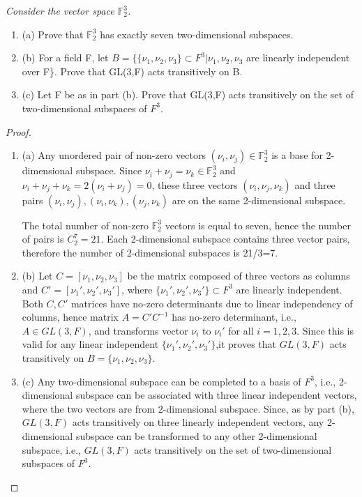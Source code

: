 \documentclass[11pt,a4paper]{article}
\newcommand{\be} {\begin{enumerate}}
\newcommand{\ee} {\end{enumerate}}
\begin{document}
{\it Consider the vector space  $\mathbb{F}_2^3$.
\be
\item[(a)] Prove that $\mathbb{F}_2^3$ has exactly seven two-dimensional subspaces.
\item[(b)] For a field F, let $B=\{\{ \nu_1,\nu_2,\nu_3\} \subset F^3| \nu_1,\nu_2,\nu_3$ are linearly independent over F\}. Prove that GL(3,F) acts transitively on B.

\item[(c)] Let F be as in part (b). Prove that GL(3,F) acts transitively on the set of two-dimensional subspaces of $F^3$.
\ee
\begin{proof}\be
\item[(a)] Any unordered pair of non-zero vectors $(\nu_i,\nu_j) \in \mathbb{F}_2^3$ is a base for 2-dimensional subspace. Since  $\nu_i+\nu_j=\nu_k \in \mathbb{F}_2^3$ and $\nu_i+\nu_j+\nu_k=2(\nu_i+\nu_j)=0$, these three vectors $(\nu_i,\nu_j,\nu_k)$ and three pairs $(\nu_i,\nu_j),(\nu_i,\nu_k),(\nu_j,\nu_k)$ are on the same 2-dimensional subspace.

The total number of non-zero $\mathbb{F}_2^3$ vectors is equal to seven, hence the number of pairs is $C_2^7=21$. Each 2-dimensional subspace contains three vector pairs, therefore the number of 2-dimensional subspaces is 21/3=7.

\item[(b)] Let $C=[\nu_1,\nu_2,\nu_3]$ be the matrix composed of three vectors as columns and $C'=[\nu_1',\nu_2',\nu_3']$, where $\{ \nu_1',\nu_2',\nu_3'\} \subset F^3$ are linearly independent. Both $C,C'$ matrices  have no-zero determinants due to linear independency of columns, hence matrix $A=C' C^{-1}$ has no-zero determinant, i.e., $A \in GL(3,F)$, and transforms vector $\nu_i$ to $\nu_i'$ for all $i=1,2,3$. Since this is valid for any linear independent $\{ \nu_1',\nu_2',\nu_3'\}$,it proves that $GL(3,F)$ acts transitively on $B=\{ \nu_1,\nu_2,\nu_3\}$. 

\item[(c)] Any two-dimensional subspace can be completed to a basis of $F^3$, i.e., 2-dimensional subspace can be associated with three linear independent vectors, where the two vectors are from 2-dimensional subspace. Since, as by part (b), $GL(3,F)$ acts transitively on three linearly independent vectors, any 2-dimensional subspace can be transformed to any other 2-dimensional subspace, i.e., $GL(3,F)$ acts transitively on the set of two-dimensional subspaces of $F^3$.   
\ee
\end{proof}
}
\end{document}
